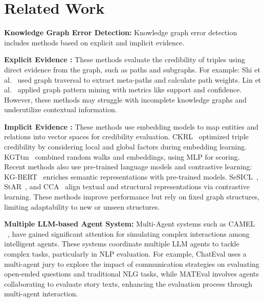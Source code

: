 \section{Related Work}


\textbf{Knowledge Graph Error Detection: } 
Knowledge graph error detection~\cite{survey} includes methods based on explicit and implicit evidence.

\textbf{Explicit Evidence :} These methods evaluate the credibility of triples using direct evidence from the graph, such as paths and subgraphs. For example:
%
Shi et al.~\cite{shi} used graph traversal to extract meta-paths and calculate path weights.
Lin et al.~\cite{lin} applied graph pattern mining with metrics like support and confidence. However, these methods may struggle with incomplete knowledge graphs and underutilize contextual information.

\textbf{Implicit Evidence :} These methods use embedding models to map entities and relations into vector spaces for credibility evaluation. 
%
CKRL~\cite{CKRL} optimized triple credibility by considering local and global factors during embedding learning.
KGTtm~\cite{kgttm} combined random walks and embeddings, using MLP for scoring. Recent methods also use pre-trained language models and contrastive learning:
KG-BERT~\cite{kg-bert} enriches semantic representations with pre-trained models.
SeSICL~\cite{sesicl}, StAR~\cite{star}, and CCA~\cite{cca} align textual and structural representations via contrastive learning. These methods improve performance but rely on fixed graph structures, limiting adaptability to new or unseen structures.


\noindent\textbf{Multiple LLM-based Agent System: } 
Multi-Agent systems such as CAMEL
~\cite{camel}, have gained significant attention for simulating complex interactions among intelligent agents. These systems coordinate multiple LLM agents to tackle complex tasks, particularly in NLP evaluation.
% 
For example, ChatEval \cite{chateval} uses a multi-agent jury to explore the impact of communication strategies on evaluating open-ended questions and traditional NLG tasks, while MATEval \cite{mateval} involves agents collaborating to evaluate story texts, enhancing the evaluation process through multi-agent interaction.